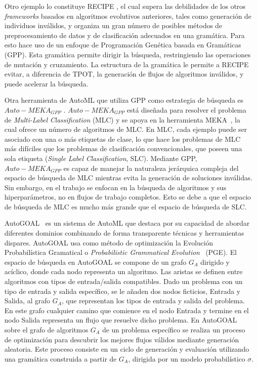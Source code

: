 Otro ejemplo lo constituye RECIPE \cite{de2017recipe}, el cual supera las debilidades de los otros \textit{frameworks} basados en algoritmos evolutivos anteriores, tales como generación de individuos inválidos, y organiza un gran número de posibles métodos de preprocesamiento de datos y de clasificación adecuados en una gramática. Para esto hace uso de un enfoque de Programación Genética basada en Gramáticas (GPP). Esta gramática permite dirigir la búsqueda, restringiendo las operaciones de mutación y cruzamiento. La estructura de la gramática le permite a RECIPE evitar, a diferencia de TPOT, la generación de flujos de algoritmos inválidos, y puede acelerar la búsqueda.

Otra herramienta de AutoML que utiliza GPP como estrategia de búsqueda es $Auto-MEKA_{GPP}$ \cite{de2018automated}. $Auto-MEKA_{GPP}$ está diseñada para resolver el problema de \textit{Multi-Label Classification} (MLC) y se apoya en la herramienta MEKA~\cite{MEKA}, la cual ofrece un número de algoritmos de MLC. En MLC, cada ejemplo puede ser asociado con una o más etiquetas de clase, lo que hace los problemas de MLC más difíciles que los problemas de clasificación convencionales, que poseen una sola etiqueta (\textit{Single Label Classification}, SLC). Mediante GPP, $Auto-MEKA_{GPP}$ es capaz de manejar la naturaleza jerárquica compleja del espacio de búsqueda de MLC mientras evita la generación de soluciones inválidas. Sin embargo, en el trabajo se enfocan en la búsqueda de algoritmos y sus hiperparámetros, no en flujos de trabajo completos. Esto se debe a que el espacio de búsqueda de MLC es mucho más grande que el espacio de búsqueda de SLC.


AutoGOAL~\cite{autogoal} es un sistema de AutoML que destaca por su capacidad de abordar diferentes dominios combinando de forma transparente técnicas y herramientas dispares. AutoGOAL usa como método de optimización la Evolución Probabilística Gramatical o \textit{Probabilistic Grammatical Evolution}~\cite{pge2015} (PGE). El espacio de búsqueda en AutoGOAL se compone de un grafo $G_A$ dirigido y acíclico, donde cada nodo representa un algoritmo. Las aristas se definen entre algoritmos con tipos de entrada/salida compatibles. Dado un problema con un tipo de entrada y salida específico, se le añaden dos nodos ficticios, Entrada y Salida, al grafo $G_A$, que representan los tipos de entrada y salida del problema. En este grafo cualquier camino que comience en el nodo Entrada y termine en el nodo Salida representa un flujo que resuelve dicho problema. En AutoGOAL sobre el grafo de algoritmos $G_A$ de un problema específico se realiza un proceso de optimización para descubrir los mejores flujos válidos mediante generación aleatoria. Este proceso consiste en un ciclo de generación y evaluación utilizando una gramática construida a partir de $G_A$, dirigida por un modelo probabilístico $\sigma$.



